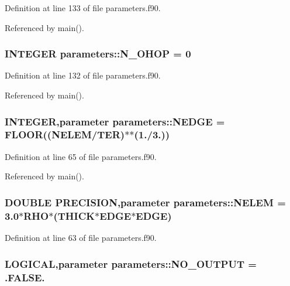 Definition at line 133 of file parameters.f90.

Referenced by main().\hypertarget{namespaceparameters_a8301da447de4717dd79fa37a925bc787}{
\subsubsection[{N\_\-OHOP}]{\setlength{\rightskip}{0pt plus 5cm}INTEGER {\bf parameters::N\_\-OHOP} = 0}}
\label{namespaceparameters_a8301da447de4717dd79fa37a925bc787}


Definition at line 132 of file parameters.f90.

Referenced by main().\hypertarget{namespaceparameters_a3f72bf9fb376fde5e0eaf3da242d4f06}{
\subsubsection[{NEDGE}]{\setlength{\rightskip}{0pt plus 5cm}INTEGER,parameter {\bf parameters::NEDGE} = FLOOR(({\bf NELEM}/{\bf TER})$\ast$$\ast$(1./3.))}}
\label{namespaceparameters_a3f72bf9fb376fde5e0eaf3da242d4f06}


Definition at line 65 of file parameters.f90.

Referenced by main().\hypertarget{namespaceparameters_a20c80b2e34c240feef7ac6887646115d}{
\subsubsection[{NELEM}]{\setlength{\rightskip}{0pt plus 5cm}DOUBLE PRECISION,parameter {\bf parameters::NELEM} = 3.0$\ast${\bf RHO}$\ast$({\bf THICK}$\ast${\bf EDGE}$\ast${\bf EDGE})}}
\label{namespaceparameters_a20c80b2e34c240feef7ac6887646115d}


Definition at line 63 of file parameters.f90.\hypertarget{namespaceparameters_ae0e5e8861d2de5239c52be62c3baebcb}{
\subsubsection[{NO\_\-OUTPUT}]{\setlength{\rightskip}{0pt plus 5cm}LOGICAL,parameter {\bf parameters::NO\_\-OUTPUT} = .FALSE.}}
\label{namespaceparameters_ae0e5e8861d2de5239c52be62c3baebcb}


